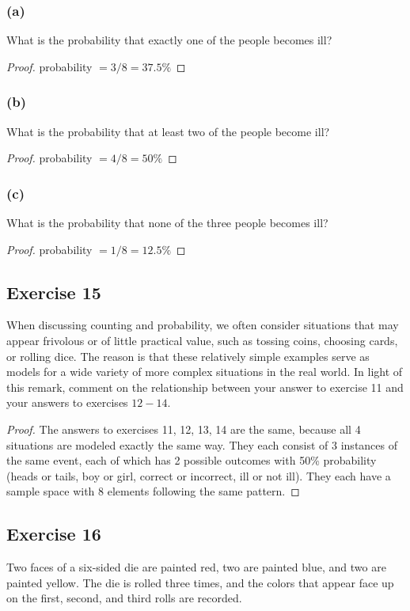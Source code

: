\documentclass[14pt]{extarticle}
\begin{document}
\subsubsection{(a)}
What is the probability that exactly one of the people becomes ill?

\begin{proof}
probability \(= 3/8 = 37.5\%\)
\end{proof}

\subsubsection{(b)}
What is the probability that at least two of the people become ill?

\begin{proof}
probability \(= 4/8 = 50\%\)
\end{proof}

\subsubsection{(c)}
What is the probability that none of the three people becomes ill?

\begin{proof}
probability \(= 1/8 = 12.5\%\)
\end{proof}

\subsection{Exercise 15}
When discussing counting and probability, we often consider situations that may appear frivolous or of little practical 
value, such as tossing coins, choosing cards, or rolling dice. The reason is that these relatively simple examples 
serve as models for a wide variety of more complex situations in the real world. In light of this remark, 
comment on the relationship between your answer to exercise 11 and your answers to exercises $12-14$.

\begin{proof}
The answers to exercises 11, 12, 13, 14 are the same, because all 4 situations are modeled exactly the same way.
They each consist of 3 instances of the same event, each of which has 2 possible outcomes with 50\% probability (heads 
or tails, boy or girl, correct or incorrect, ill or not ill). They each have a sample space with 8 elements 
following the same pattern.
\end{proof}

\subsection{Exercise 16}
Two faces of a six-sided die are painted red, two are painted blue, and two are painted yellow. The die is rolled 
three times, and the colors that appear face up on the first, second, and third rolls are recorded.
\end{document}
